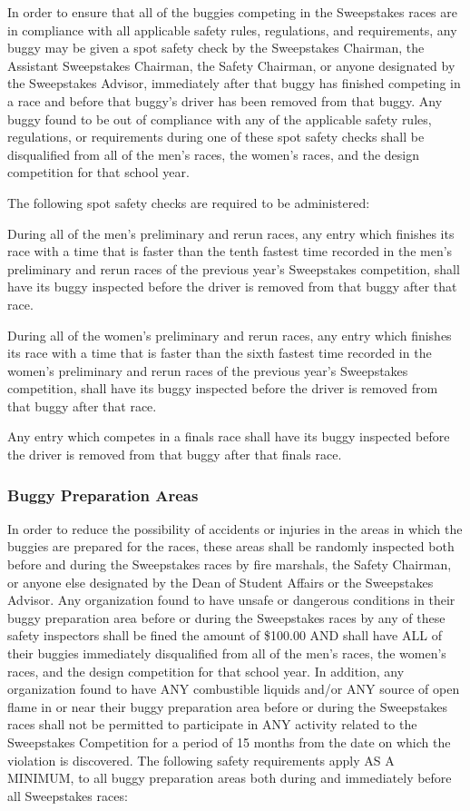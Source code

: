 	In order to ensure that all of the buggies competing in the Sweepstakes races
	are in compliance with all applicable safety rules, regulations, and
	requirements, any buggy may be given a spot safety check by the Sweepstakes
	Chairman, the Assistant Sweepstakes Chairman, the Safety Chairman, or anyone
	designated by the Sweepstakes Advisor, immediately after that buggy has
	finished competing in a race and before that buggy's driver has been removed
	from that buggy. Any buggy found to be out of compliance with any of the
	applicable safety rules, regulations, or requirements during one of these spot
	safety checks shall be disqualified from all of the men's races, the women's
	races, and the design competition for that school year.

	The following spot safety checks are required to be administered:

	During all of the men's preliminary and rerun races, any entry which finishes
	its race with a time that is faster than the tenth fastest time recorded in the
	men's preliminary and rerun races of the previous year's Sweepstakes
	competition, shall have its buggy inspected before the driver is removed from
	that buggy after that race.

	During all of the women's preliminary and rerun races, any entry which finishes
	its race with a time that is faster than the sixth fastest time recorded in the
	women's preliminary and rerun races of the previous year's Sweepstakes
	competition, shall have its buggy inspected before the driver is removed from
	that buggy after that race.

	Any entry which competes in a finals race shall have its buggy inspected before
	the driver is removed from that buggy after that finals race.

\subsubsection{Buggy Preparation Areas}

	In order to reduce the possibility of accidents or injuries in the areas in
	which the buggies are prepared for the races, these areas shall be randomly
	inspected both before and during the Sweepstakes races by fire marshals, the
	Safety Chairman, or anyone else designated by the Dean of Student Affairs or
	the Sweepstakes Advisor. Any organization found to have unsafe or dangerous
	conditions in their buggy preparation area before or during the Sweepstakes
	races by any of these safety inspectors shall be fined the amount of \$100.00
	AND shall have ALL of their buggies immediately disqualified from all of the
	men's races, the women's races, and the design competition for that school
	year. In addition, any organization found to have ANY combustible liquids
	and/or ANY source of open flame in or near their buggy preparation area before
	or during the Sweepstakes races shall not be permitted to participate in ANY
	activity related to the Sweepstakes Competition for a period of 15 months from
	the date on which the violation is discovered. The following safety
	requirements apply AS A MINIMUM, to all buggy preparation areas both during and
	immediately before all Sweepstakes races:

